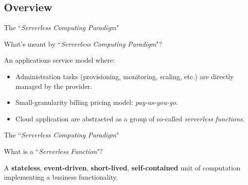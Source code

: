 \documentclass[13.5pt]{beamer}
\begin{document}
\subsection{Overview}

\begin{frame}{The ``\textit{Serverless Computing Paradigm}"}


\begin{block}{}
What's meant by ``\textit{Serverless Computing Paradigm}"?
\justifying	
\end{block}
\vspace{\baselineskip}
An applications service model where:
\vspace{\baselineskip}
\begin{itemize}
	\item Administration tasks (provisioning, monitoring, scaling, etc.) are directly managed by the provider.
	\vspace{\baselineskip}
	\item Small-granularity billing pricing model: \textit{pay-as-you-go}.
	\vspace{\baselineskip}
	\item Cloud application are abstracted as a group of so-called \textit{serverless functions}.
	
\end{itemize}

\end{frame} 
\begin{frame}{The ``\textit{Serverless Computing Paradigm}"}
	
	
	\begin{block}{}
		What is a ``\textit{Serverless Function}"?
		\justifying	
	\end{block}
	\vspace{\baselineskip}
	A \textbf{stateless}, \textbf{event-driven}, \textbf{short-lived}, \textbf{self-contained} unit of computation implementing a business functionality.
	\vspace{\baselineskip}
	

	
\end{frame} 
\end{document}
